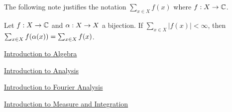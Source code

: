 \documentclass{book}
\begin{document}
	The following note justifies the notation $\sum_{x \in X}f(x)$ where $f:X \rightarrow \mathbb{C}$.
	
	\begin{note}
		Let $f:X \rightarrow \mathbb{C}$ and $\alpha:X \rightarrow X$ a bijection. If $\sum_{x \in X}|f(x)|< \infty$, then $\sum_{x \in X}f( \alpha (x)) = \sum_{x \in X}f(x) $.
	\end{note}

	
	\backmatter
	\begin{thebibliography}{4}
	
 \href{https://github.com/carsonaj/Mathematics/blob/master/Introduction\%20to\%20Algebra/Introduction\%20to\%20Algebra.pdf}{Introduction to Algebra}

  \href{https://github.com/carsonaj/Mathematics/blob/master/Introduction\%20to\%20Analysis/Introduction\%20to\%20Analysis.pdf}{Introduction to Analysis}	

  \href{https://github.com/carsonaj/Mathematics/blob/master/Introduction\%20to\%20Fourier\%20Analysis/Introduction\%20to\%20Fourier\%20Analysis.pdf}{Introduction to Fourier Analysis}

  \href{https://github.com/carsonaj/Mathematics/blob/master/Introduction\%20to\%20Measure\%20and\%20Integration/Introduction\%20to\%20Measure\%20and\%20Integration.pdf}{Introduction to Measure and Integration}

\end{thebibliography}
	
\end{document}
